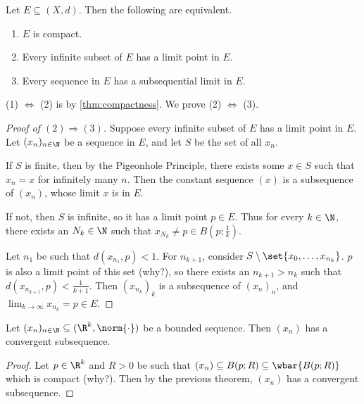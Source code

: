 \begin{theorem*} \label{thm:compact:subsequential_limit}
    Let $E \subseteq (X, d)$.
    Then the following are equivalent.
    \begin{enumerate}[label=(\arabic*)]
        \item $E$ is compact.
        \item Every infinite subset of $E$ has a limit point in $E$.
        \item Every sequence in $E$ has a subsequential limit in $E$.
    \end{enumerate}
\end{theorem*}
(1) $\iff$ (2) is by \cref{thm:compactness}.
We prove (2) $\iff$ (3).
\begin{proof}[Proof of $(2) \Rightarrow (3)$]
    Suppose every infinite subset of $E$ has a limit point in $E$.
    Let $(x_n)_{n \in \N}$ be a sequence in $E$, and let $S$ be the set of
    all $x_n$.

    If $S$ is finite, then by the Pigeonhole Principle, there exists
    some $x \in S$ such that $x_n = x$ for infinitely many $n$.
    Then the constant sequence $(x)$ is a subsequence of $(x_n)$, whose
    limit $x$ is in $E$.

    If not, then $S$ is infinite, so it has a limit point $p \in E$.
    Thus for every $k \in \N$, there exists an $N_k \in \N$ such that
    $x_{N_k} \ne p \in B(p; \frac1k)$.

    Let $n_1$ be such that $d(x_{n_1}, p) < 1$.
    For $n_{k+1}$, consider $S \setminus \set{x_0, \ldots, x_{n_k}}$.
    $p$ is also a limit point of this set (\textcolor{exercise}{why?}),
    so there exists an $n_{k+1} > n_k$ such that $d(x_{n_{k+1}}, p)
    < \frac1{k+1}$.
    Then $(x_{n_k})_k$ is a subsequence of $(x_n)_n$, and
    $\lim_{k \to \infty} x_{n_k} = p \in E$.
\end{proof}
\begin{corollary}
    Let $(x_n)_{n \in \N} \subseteq (\R^k, \norm{\cdot})$ be a bounded
    sequence.
    Then $(x_n)$ has a convergent subsequence.
\end{corollary}
\begin{proof}
    Let $p \in \R^k$ and $R > 0$ be such that $(x_n) \subseteq B(p; R)
    \subseteq \wbar{B(p; R)}$ which is compact (\textcolor{exercise}{why?}).
    Then by the previous theorem, $(x_n)$ has a convergent subsequence.
\end{proof}
